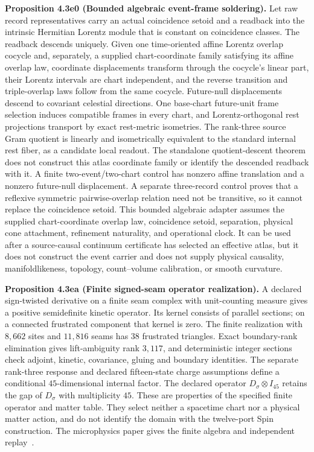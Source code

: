 \textbf{Proposition 4.3e0 (Bounded algebraic event-frame soldering).}
Let raw record representatives carry an actual coincidence setoid and a readback into
the intrinsic Hermitian Lorentz module that is constant on coincidence
classes. The readback descends uniquely. Given one time-oriented affine
Lorentz overlap cocycle and, separately, a supplied chart-coordinate family
satisfying its affine overlap law, coordinate displacements transform through
the cocycle's linear part, their Lorentz intervals are chart independent, and
the reverse transition and triple-overlap laws follow from the same cocycle. Future-null
displacements descend to covariant celestial directions. One base-chart
future-unit frame selection induces compatible frames in every chart, and
Lorentz-orthogonal rest projections transport by exact rest-metric
isometries. The rank-three source Gram quotient is linearly and isometrically
equivalent to the standard internal rest fiber, as a candidate local readout.
The standalone quotient-descent theorem does not construct this atlas
coordinate family or identify the descended readback with it.
A finite two-event/two-chart control has nonzero affine translation and a
nonzero future-null displacement. A separate three-record control proves that a
reflexive symmetric pairwise-overlap relation need not be transitive, so it
cannot replace the coincidence setoid. This bounded algebraic adapter
assumes the supplied chart-coordinate overlap law, coincidence setoid,
separation, physical cone attachment, refinement naturality, and operational
clock. It can be used after a source-causal continuum certificate has
selected an effective atlas, but it does not construct the event carrier and
does not supply physical causality, manifoldlikeness, topology, count--volume
calibration, or smooth curvature.

\textbf{Proposition 4.3ea (Finite signed-seam operator realization).}
A declared sign-twisted derivative on a finite seam complex with unit-counting
measure gives a positive semidefinite kinetic operator. Its kernel consists
of parallel sections; on a connected frustrated component that kernel is
zero. The finite realization with \(8{,}662\) sites and \(11{,}816\) seams
has \(38\) frustrated triangles. Exact boundary-rank elimination gives
lift-ambiguity rank \(3{,}117\), and deterministic integer sections check
adjoint, kinetic, covariance, gluing and boundary identities.
The separate rank-three response and declared fifteen-state charge assumptions
define a conditional \(45\)-dimensional internal factor. The declared operator
\(D_\sigma\otimes I_{45}\) retains the gap of \(D_\sigma\) with multiplicity
\(45\). These are properties of the specified finite
operator and matter table. They select neither a spacetime chart nor a
physical matter action, and do not identify the domain with the twelve-port
Spin construction. The microphysics paper gives the finite algebra and
independent replay~\cite{ophfpe}.

